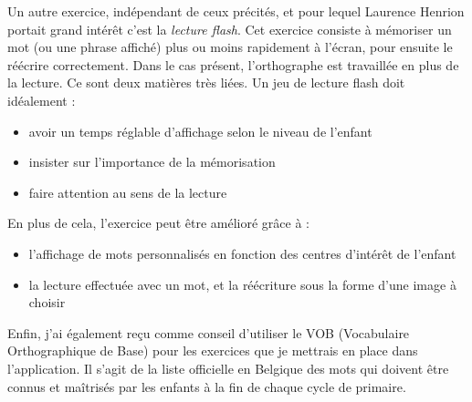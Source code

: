 Un autre exercice, indépendant de ceux précités, et pour lequel Laurence Henrion portait grand intérêt c'est la \textit{lecture flash}. Cet exercice consiste à mémoriser un mot (ou une phrase affiché) plus ou moins rapidement à l'écran, pour ensuite le réécrire correctement. Dans le cas présent, l'orthographe est travaillée en plus de la lecture. Ce sont deux matières très liées. Un jeu de lecture flash doit idéalement :
\begin{itemize}
\item avoir un temps réglable d'affichage selon le niveau de l'enfant
\item insister sur l'importance de la mémorisation
\item faire attention au sens de la lecture
\end{itemize}
En plus de cela, l'exercice peut être amélioré grâce à :
\begin{itemize}
\item l'affichage de mots personnalisés en fonction des centres d'intérêt de l'enfant
\item la lecture effectuée avec un mot, et la réécriture sous la forme d'une image à choisir\\
\end{itemize}

Enfin, j'ai également reçu comme conseil d'utiliser le VOB (Vocabulaire Orthographique de Base) pour les exercices que je mettrais en place dans l'application. Il s'agit de la liste officielle en Belgique des mots qui doivent être connus et maîtrisés par les enfants à la fin de chaque cycle de primaire.


\newpage
